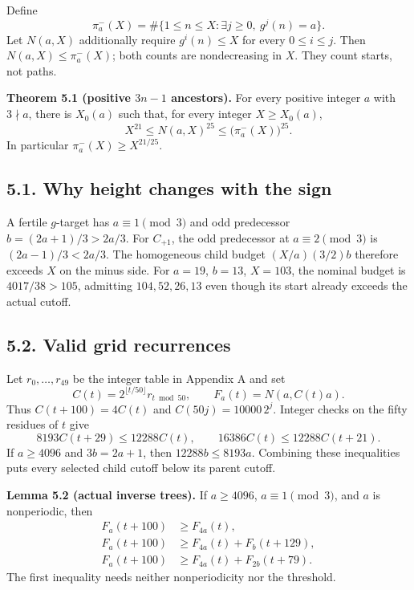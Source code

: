 \documentclass[11pt,a4paper]{article}
\begin{document}
Define \[
\pi^-_a(X)=\#\{1\le n\le X:\exists j\ge0,\ g^j(n)=a\}.
\] Let \(N(a,X)\) additionally require \(g^i(n)\le X\) for every
\(0\le i\le j\). Then \(N(a,X)\le\pi^-_a(X)\); both counts are
nondecreasing in \(X\). They count starts, not paths.

\textbf{Theorem 5.1 (positive \(3n-1\) ancestors).} For every positive
integer \(a\) with \(3\nmid a\), there is \(X_0(a)\) such that, for
every integer \(X\ge X_0(a)\), \[
X^{21}\le N(a,X)^{25}\le\bigl(\pi^-_a(X)\bigr)^{25}.
\tag{5.1}
\] In particular \(\pi^-_a(X)\ge X^{21/25}\).

\subsection{5.1. Why height changes with the
sign}\label{why-height-changes-with-the-sign}

A fertile \(g\)-target has \(a\equiv1\pmod3\) and odd predecessor
\(b=(2a+1)/3>2a/3\). For \(C_{+1}\), the odd predecessor at
\(a\equiv2\pmod3\) is \((2a-1)/3<2a/3\). The homogeneous child budget
\((X/a)(3/2)b\) therefore exceeds \(X\) on the minus side. For \(a=19\),
\(b=13\), \(X=103\), the nominal budget is \(4017/38>105\), admitting
\(104,52,26,13\) even though its start already exceeds the actual
cutoff.

\subsection{5.2. Valid grid recurrences}\label{valid-grid-recurrences}

Let \(r_0,\ldots,r_{49}\) be the integer table in Appendix A and set \[
C(t)=2^{\lfloor t/50\rfloor}r_{t\bmod50},\qquad
F_a(t)=N(a,C(t)a).
\] Thus \(C(t+100)=4C(t)\) and \(C(50j)=10000\,2^j\). Integer checks on
the fifty residues of \(t\) give \[
8193C(t+29)\le12288C(t),\qquad
16386C(t)\le12288C(t+21).
\tag{5.2}
\] If \(a\ge4096\) and \(3b=2a+1\), then \(12288b\le8193a\). Combining
these inequalities puts every selected child cutoff below its parent
cutoff.

\textbf{Lemma 5.2 (actual inverse trees).} If \(a\ge4096\),
\(a\equiv1\pmod3\), and \(a\) is nonperiodic, then \[
\begin{aligned}
F_a(t+100)&\ge F_{4a}(t),\\
F_a(t+100)&\ge F_{4a}(t)+F_b(t+129),\\
F_a(t+100)&\ge F_{4a}(t)+F_{2b}(t+79).
\end{aligned}
\tag{5.3}
\] The first inequality needs neither nonperiodicity nor the threshold.
\end{document}
